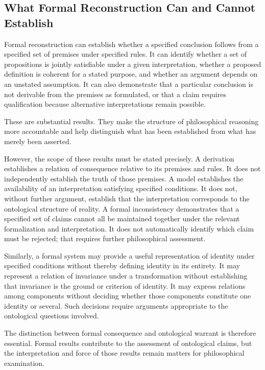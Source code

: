 \subsection{What Formal Reconstruction Can and Cannot Establish}

Formal reconstruction can establish whether a specified conclusion follows
from a specified set of premises under specified rules. It can identify
whether a set of propositions is jointly satisfiable under a given
interpretation, whether a proposed definition is coherent for a stated
purpose, and whether an argument depends on an unstated assumption. It can
also demonstrate that a particular conclusion is not derivable from the
premises as formulated, or that a claim requires qualification because
alternative interpretations remain possible.

These are substantial results. They make the structure of philosophical
reasoning more accountable and help distinguish what has been established
from what has merely been asserted.

However, the scope of these results must be stated precisely. A derivation
establishes a relation of consequence relative to its premises and rules.
It does not independently establish the truth of those premises. A model
establishes the availability of an interpretation satisfying specified
conditions. It does not, without further argument, establish that the
interpretation corresponds to the ontological structure of reality. A
formal inconsistency demonstrates that a specified set of claims cannot
all be maintained together under the relevant formalization and
interpretation. It does not automatically identify which claim must be
rejected; that requires further philosophical assessment.

Similarly, a formal system may provide a useful representation of identity
under specified conditions without thereby defining identity in its
entirety. It may represent a relation of invariance under a transformation
without establishing that invariance is the ground or criterion of
identity. It may express relations among components without deciding
whether those components constitute one identity or several. Such
decisions require arguments appropriate to the ontological questions
involved.

The distinction between formal consequence and ontological warrant is
therefore essential. Formal results contribute to the assessment of
ontological claims, but the interpretation and force of those results
remain matters for philosophical examination.

